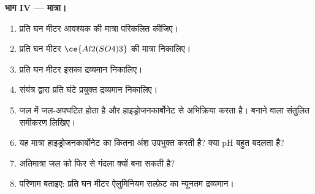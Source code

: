 \begin{problem}
\medskip\noindent\textbf{भाग IV --- मात्रा।}
\begin{enumerate}[resume]
  \item प्रति घन मीटर आवश्यक  की मात्रा परिकलित कीजिए।
  \item प्रति घन मीटर $\ce{Al2(SO4)3}$ की मात्रा निकालिए।
  \item प्रति घन मीटर इसका द्रव्यमान निकालिए।
  \item संयंत्र द्वारा प्रति घंटे प्रयुक्त द्रव्यमान निकालिए।
  \item जल में  जल-अपघटित होता है और हाइड्रोजनकार्बोनेट से अभिक्रिया करता है।
         बनाने वाला संतुलित समीकरण लिखिए।
  \item यह मात्रा हाइड्रोजनकार्बोनेट का कितना अंश उपभुक्त करती है? क्या
        pH बहुत बदलता है?
  \item अतिमात्रा जल को फिर से गंदला क्यों बना सकती है?
  \item परिणाम बताइए: प्रति घन मीटर ऐलुमिनियम सल्फ़ेट का न्यूनतम द्रव्यमान।
\end{enumerate}
\end{problem}
